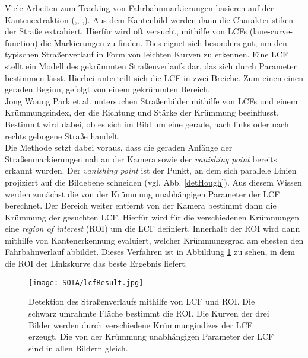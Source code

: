 Viele Arbeiten zum Tracking von Fahrbahnmarkierungen basieren auf der Kantenextraktion (\cite{Voisin2005},\cite{bai2010multiple}, \cite{Park20032301},\cite{wang2004lane}). Aus dem Kantenbild werden dann die Charakteristiken der Straße extrahiert.
Hierfür wird oft versucht, mithilfe von LCFs (lane-curve-function) die Markierungen zu finden. Dies eignet sich besonders gut, um den typischen Straßenverlauf in Form von leichten Kurven zu erkennen. Eine LCF stellt ein Modell des gekrümmten Straßenverlaufs dar, das sich durch Parameter bestimmen lässt. Hierbei unterteilt sich die LCF in zwei Breiche. Zum einen einen geraden Beginn, gefolgt von einem gekrümmten Bereich.\\
Jong Woung Park et al.\cite{Park20032301} untersuchen Straßenbilder mithilfe von LCFs und einem Krümmungsindex, der die Richtung und Stärke der Krümmung beeinflusst. Bestimmt wird dabei, ob es sich im Bild um eine gerade, nach links oder nach rechts gebogene Straße handelt.\\
Die Methode setzt dabei voraus, dass die geraden Anfänge der Straßenmarkierungen nah an der Kamera sowie der \textit{vanishing point} bereits erkannt wurden. Der \textit{vanishing point} ist der Punkt, an dem sich parallele Linien projiziert auf die Bildebene schneiden (vgl. Abb. \ref{detHough}). Aus diesem Wissen werden zunächst die von der Krümmung unabhängigen Parameter der LCF berechnet. Der Bereich weiter entfernt von der Kamera bestimmt dann die Krümmung der gesuchten LCF. Hierfür wird für die verschiedenen Krümmungen eine \textit{region of interest} (ROI) um die LCF definiert. Innerhalb der ROI wird dann mithilfe von Kantenerkennung evaluiert, welcher Krümmungsgrad am ehesten den Fahrbahnverlauf abbildet. Dieses Verfahren ist in Abbildung \ref{lcfDec} zu sehen, in dem die ROI der Linkskurve das beste Ergebnis liefert.
\begin{figure}[H]
	\centering
	\texttt{[image: SOTA/lcfResult.jpg]}
	\caption[Detektion eines Straßenverlaufs über eine LCF]{Detektion des Straßenverlaufs mithilfe von LCF und ROI. Die schwarz umrahmte Fläche bestimmt die ROI. Die Kurven der drei Bilder werden durch verschiedene Krümmungindizes der LCF erzeugt. Die von der Krümmung unabhängigen Parameter der LCF sind in allen Bildern gleich.}
	\label{lcfDec}
\end{figure}

